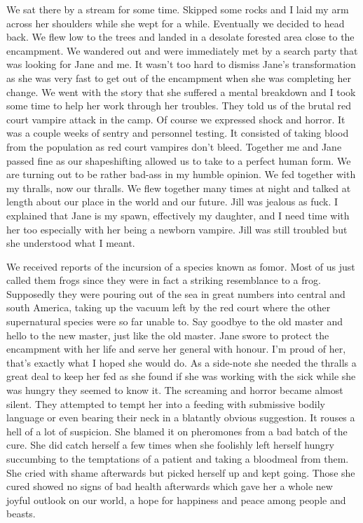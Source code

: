 We sat there by a stream for some time. Skipped some rocks and I laid my arm across her shoulders while she wept for a while. Eventually we decided to head back. We flew low to the trees and landed in a desolate forested area close to the encampment. We wandered out and were immediately met by a search party that was looking for Jane and me. It wasn't too hard to dismiss Jane's transformation as she was very fast to get out of the encampment when she was completing her change. We went with the story that she suffered a mental breakdown and I took some time to help her work through her troubles. They told us of the brutal red court vampire attack in the camp. Of course we expressed shock and horror. It was a couple weeks of sentry and personnel testing. It consisted of taking blood from the population as red court vampires don't bleed. Together me and Jane passed fine as our shapeshifting allowed us to take to a perfect human form. We are turning out to be rather bad-ass in my humble opinion. We fed together with my thralls, now our thralls. We flew together many times at night and talked at length about our place in the world and our future. Jill was jealous as fuck. I explained that Jane is my spawn, effectively my daughter, and I need time with her too especially with her being a newborn vampire. Jill was still troubled but she understood what I meant.

We received reports of the incursion of a species known as fomor. Most of us just called them frogs since they were in fact a striking resemblance to a frog. Supposedly they were pouring out of the sea in great numbers into central and south America, taking up the vacuum left by the red court where the other supernatural species were so far unable to. Say goodbye to the old master and hello to the new master, just like the old master. Jane swore to protect the encampment with her life and serve her general with honour. I'm proud of her, that's exactly what I hoped she would do. As a side-note she needed the thralls a great deal to keep her fed as she found if she was working with the sick while she was hungry they seemed to know it. The screaming and horror became almost silent. They attempted to tempt her into a feeding with submissive bodily language or even bearing their neck in a blatantly obvious suggestion. It rouses a hell of a lot of suspicion. She blamed it on pheromones from a bad batch of the cure. She did catch herself a few times when she foolishly left herself hungry succumbing to the temptations of a patient and taking a bloodmeal from them. She cried with shame afterwards but picked herself up and kept going. Those she cured showed no signs of bad health afterwards which gave her a whole new joyful outlook on our world, a hope for happiness and peace among people and beasts.

